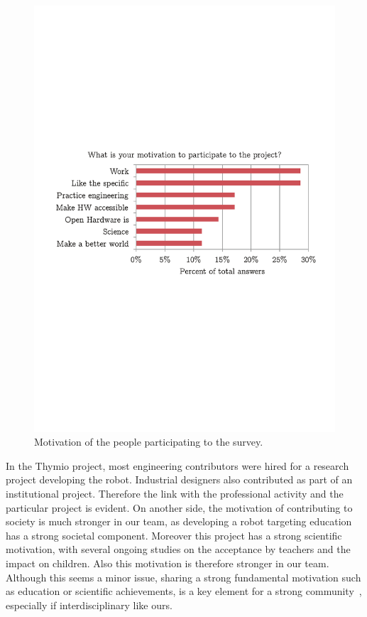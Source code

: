 \documentclass[letterpaper, 10 pt, conference]{ieeeconf}  %
\begin{document}
\begin{figure}
\centering
\includegraphics[width=\columnwidth]{figures/motivation}
\caption{Motivation of the people participating to the survey.}
\label{fig:motivation}
\end{figure}

In the Thymio project, most engineering contributors were hired for a research project developing the robot. 
Industrial designers also contributed as part of an institutional project.
Therefore the link with the professional activity and the particular project is evident.
On another side, the motivation of contributing to society is much stronger in our team, as developing a robot targeting education has a strong societal component.
Moreover this project has a strong scientific motivation, with several ongoing studies on the acceptance by teachers and the impact on children.
Also this motivation is therefore stronger in our team.
Although this seems a minor issue, sharing a strong fundamental motivation such as education or scientific achievements, is a key element for a strong community~\cite{Stahlbrost2011}, especially if interdisciplinary like ours.
\end{document}
